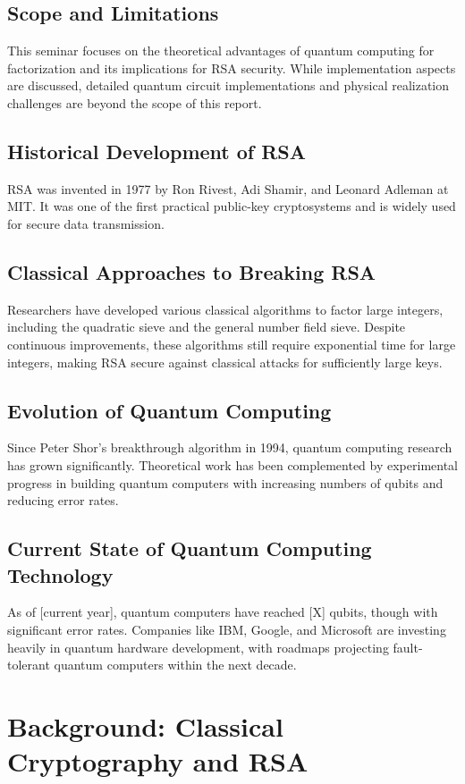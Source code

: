 \documentclass{article}
\begin{document}
\subsection{Scope and Limitations}
This seminar focuses on the theoretical advantages of quantum computing for factorization and its implications for RSA security. While implementation aspects are discussed, detailed quantum circuit implementations and physical realization challenges are beyond the scope of this report.

\subsection{Historical Development of RSA}
RSA was invented in 1977 by Ron Rivest, Adi Shamir, and Leonard Adleman at MIT. It was one of the first practical public-key cryptosystems and is widely used for secure data transmission.

\subsection{Classical Approaches to Breaking RSA}
Researchers have developed various classical algorithms to factor large integers, including the quadratic sieve and the general number field sieve. Despite continuous improvements, these algorithms still require exponential time for large integers, making RSA secure against classical attacks for sufficiently large keys.

\subsection{Evolution of Quantum Computing}
Since Peter Shor's breakthrough algorithm in 1994, quantum computing research has grown significantly. Theoretical work has been complemented by experimental progress in building quantum computers with increasing numbers of qubits and reducing error rates.

\subsection{Current State of Quantum Computing Technology}
As of [current year], quantum computers have reached [X] qubits, though with significant error rates. Companies like IBM, Google, and Microsoft are investing heavily in quantum hardware development, with roadmaps projecting fault-tolerant quantum computers within the next decade.

\section{Background: Classical Cryptography and RSA}
\end{document}
